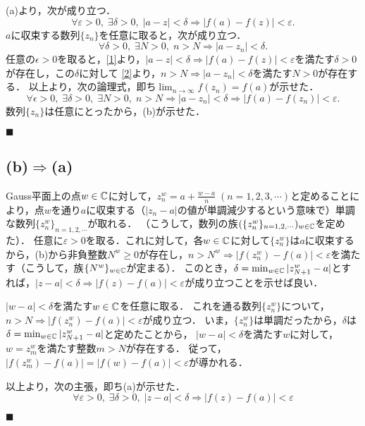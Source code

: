 \documentclass[uplatex, 12pt, dvipdfmx]{jsarticle}
\begin{document}
(a)より，次が成り立つ．
\begin{equation}\label{1}
    \forall\varepsilon>0,\;\exists\delta>0,\;|a-z|<\delta\Rightarrow|f(a)-f(z)|<\varepsilon.
\end{equation}
$a$に収束する数列$\{z_n\}$を任意に取ると，次が成り立つ．
\begin{equation}\label{2}
    \forall\delta>0,\;\exists N>0,\;n>N\Rightarrow|a-z_n|<\delta.
\end{equation}
任意の$\epsilon>0$を取ると，\ref{1}より，$|a-z|<\delta\Rightarrow|f(a)-f(z)|<\varepsilon$を満たす$\delta>0$が存在し，この$\delta$に対して
\ref{2}より，$n>N\Rightarrow|a-z_n|<\delta$を満たす$N>0$が存在する．
以上より，次の論理式，即ち$\lim_{n\to\infty}f(z_n)=f(a)$が示せた．
\[\forall\epsilon>0,\;\exists\delta>0,\;\exists N>0,\;n>N\Rightarrow|a-z_n|<\delta\Rightarrow|f(a)-f(z_n)|<\varepsilon.\]
数列$\{z_n\}$は任意にとったから，(b)が示せた．

\begin{flushright}$\blacksquare$\end{flushright}

\subsection*{(b)$\Rightarrow$(a)}

Gauss平面上の点$w\in\mathbb{C}$に対して，$z^w_n=a+\frac{w-a}{n}\;(n=1,2,3,\cdots)$と定めることにより，点$w$を通り$a$に収束する（$|z_n-a|$の値が単調減少するという意味で）単調な数列$\{z_n^w\}_{n=1,2,\cdots}$が取れる．
（こうして，数列の族$(\{z^w_n\}_{n=1,2,\cdots})_{w\in\mathbb{C}}$を定めた）．
任意に$\varepsilon>0$を取る．これに対して，各$w\in\mathbb{C}$に対して$\{z^w_n\}$は$a$に収束するから，(b)から非負整数$N^w\ge 0$が存在し，$n>N^w\Rightarrow|f(z^w_n)-f(a)|<\varepsilon$を満たす（こうして，族$\{N^w\}_{w\in\mathbb{C}}$が定まる）．
このとき，$\delta=\min_{w\in\mathbb{C}}|z^w_{N+1}-a|$とすれば，$|z-a|<\delta\Rightarrow|f(z)-f(a)|<\varepsilon$が成り立つことを示せば良い．

$|w-a|<\delta$を満たす$w\in\mathbb{C}$を任意に取る．
これを通る数列$\{z_n^w\}$について，$n>N\Rightarrow |f(z_n^w)-f(a)|<\varepsilon$が成り立つ．
いま，$\{z_n^w\}$は単調だったから，$\delta$は$\delta=\min_{w\in\mathbb{C}}|z^w_{N+1}-a|$と定めたことから，
$|w-a|<\delta$を満たす$w$に対して，$w=z^w_m$を満たす整数$m>N$が存在する．
従って，$|f(z_m^w)-f(a)|=|f(w)-f(a)|<\varepsilon$が導かれる．

以上より，次の主張，即ち(a)が示せた．
\[ \forall\varepsilon>0,\;\exists\delta>0,\;|z-a|<\delta\Rightarrow|f(z)-f(a)|<\varepsilon \]
\begin{flushright}$\blacksquare$\end{flushright}
\end{document}

